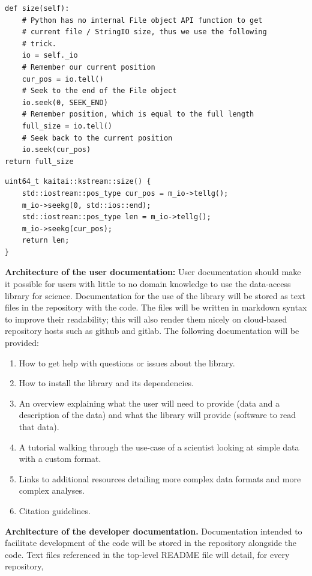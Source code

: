 \begin{lstlisting}
def size(self):
    # Python has no internal File object API function to get
    # current file / StringIO size, thus we use the following
    # trick.
    io = self._io
    # Remember our current position
    cur_pos = io.tell()
    # Seek to the end of the File object
    io.seek(0, SEEK_END)
    # Remember position, which is equal to the full length
    full_size = io.tell()
    # Seek back to the current position
    io.seek(cur_pos)
return full_size
\end{lstlisting}

\begin{lstlisting}
uint64_t kaitai::kstream::size() {
    std::iostream::pos_type cur_pos = m_io->tellg();
    m_io->seekg(0, std::ios::end);
    std::iostream::pos_type len = m_io->tellg();
    m_io->seekg(cur_pos);
    return len;
}
\end{lstlisting}

\textbf{Architecture of the user documentation:} User documentation should make it possible for users with little to no domain knowledge to use the data-access library for science.  Documentation for the use of the library will be stored as text files in the repository with the code.  The files will be written in markdown syntax to improve their readability; this will also render them nicely on cloud-based repository hosts such as github and gitlab.  The following documentation will be provided:

\begin{enumerate}
    \item How to get help with questions or issues about the library.
    \item How to install the library and its dependencies.
    \item An overview explaining what the user will need to provide (data and a description of the data) and what the library will provide (software to read that data).
    \item A tutorial walking through the use-case of a scientist looking at simple data with a custom format.
    \item Links to additional resources detailing more complex data formats and more complex analyses.
    \item Citation guidelines.  
\end{enumerate}


\textbf{Architecture of the developer documentation.}  Documentation intended to facilitate development of the code will be stored in the repository alongside the code.  Text files referenced in the top-level README file will detail, for every repository,

